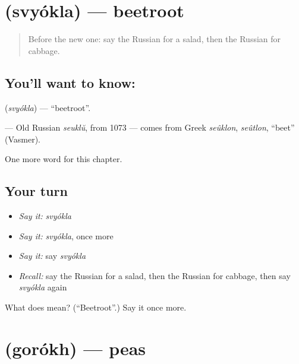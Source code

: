 \section[\texorpdfstring{\ru{свёкла} (svyókla)}{свёкла (svyókla)}]{ (svyókla) — beetroot}

\label{lesson:RU-C194-svyokla}



\begin{quote}
Before the new one: say the Russian for a salad, then the Russian for cabbage.
\end{quote}

\subsection*{You'll want to know: }
\textbf{} (\emph{svyókla}) — \textquotedblleft{}beetroot\textquotedblright{}.

\begin{cousinweb}
\textbf{} — Old Russian \emph{seuklŭ}, from 1073 — comes from Greek \emph{seûklon}, \emph{seûtlon}, \textquotedblleft{}beet\textquotedblright{} (Vasmer).
\end{cousinweb}

\begin{grammarlens}[title={What you've built}]
One more word for this chapter.
\end{grammarlens}

\subsection*{Your turn}
\begin{itemize}
\raggedright
  \item \emph{Say it:} \emph{svyókla}
  \item \emph{Say it:} \emph{svyókla}, once more
  \item \emph{Say it:} say \emph{svyókla}
  \item \emph{Recall:} say the Russian for a salad, then the Russian for cabbage, then say \emph{svyókla} again
\end{itemize}

\begin{tcolorbox}[breakable,colback=teal!4,colframe=teal!35!black,title={Before you move on}]
What does  mean? (\textquotedblleft{}Beetroot\textquotedblright{}.) Say it once more.
\end{tcolorbox}
\section[\texorpdfstring{\ru{горох} (gorókh)}{горох (gorókh)}]{ (gorókh) — peas}


